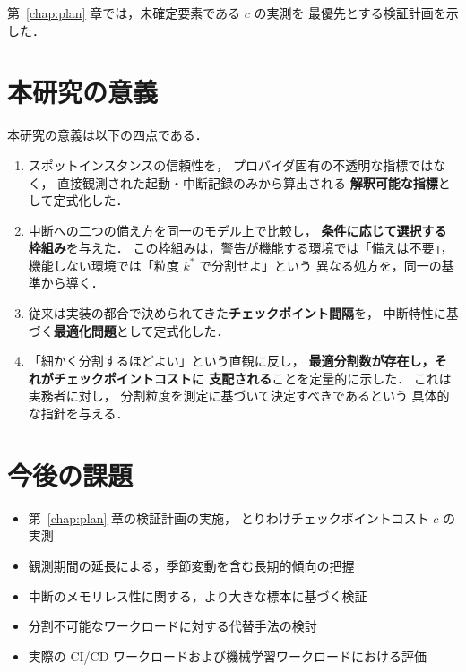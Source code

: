 \documentclass[11pt,a4paper]{ltjsreport}
\begin{document}
第~\ref{chap:plan} 章では，未確定要素である $c$ の実測を
最優先とする検証計画を示した．

\section{本研究の意義}

本研究の意義は以下の四点である．

\begin{enumerate}
  \item スポットインスタンスの信頼性を，
        プロバイダ固有の不透明な指標ではなく，
        直接観測された起動・中断記録のみから算出される
        \textbf{解釈可能な指標}として定式化した．
  \item 中断への二つの備え方を同一のモデル上で比較し，
        \textbf{条件に応じて選択する枠組み}を与えた．
        この枠組みは，警告が機能する環境では「備えは不要」，
        機能しない環境では「粒度 $k^{*}$ で分割せよ」という
        異なる処方を，同一の基準から導く．
  \item 従来は実装の都合で決められてきた\textbf{チェックポイント間隔}を，
        中断特性に基づく\textbf{最適化問題}として定式化した．
  \item 「細かく分割するほどよい」という直観に反し，
        \textbf{最適分割数が存在し，それがチェックポイントコストに
        支配される}ことを定量的に示した．
        これは実務者に対し，
        分割粒度を測定に基づいて決定すべきであるという
        具体的な指針を与える．
\end{enumerate}

\section{今後の課題}

\begin{itemize}
  \item 第~\ref{chap:plan} 章の検証計画の実施，
        とりわけチェックポイントコスト $c$ の実測
  \item 観測期間の延長による，季節変動を含む長期的傾向の把握
  \item 中断のメモリレス性に関する，より大きな標本に基づく検証
  \item 分割不可能なワークロードに対する代替手法の検討
  \item 実際の CI/CD ワークロードおよび機械学習ワークロードにおける評価
\end{itemize}

\end{document}
